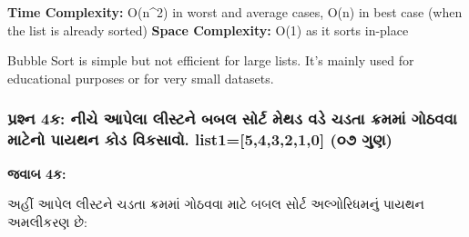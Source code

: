 \textbf{Time Complexity:} O(n\^{}2) in worst and average cases, O(n) in
best case (when the list is already sorted) \textbf{Space Complexity:}
O(1) as it sorts in-place

Bubble Sort is simple but not efficient for large lists. It's mainly
used for educational purposes or for very small datasets.

\hypertarget{uxaaauxab0uxab6uxaa8-4uxa95-uxaa8uxa9a-uxa86uxaaauxab2-uxab2uxab8uxa9fuxaa8-uxaacuxaacuxab2-uxab8uxab0uxa9f-uxaaeuxaa5uxaa1-uxab5uxaa1-uxa9auxaa1uxaa4-uxa95uxab0uxaaeuxaae-uxa97uxaa0uxab5uxab5-uxaaeuxa9fuxaa8-uxaaauxaafuxaa5uxaa8-uxa95uxaa1-uxab5uxa95uxab8uxab5.-list1543210-uxae6uxaed-uxa97uxaa3}{%
\subsubsection{પ્રશ્ન 4ક: નીચે આપેલા લીસ્ટને બબલ સોર્ટ મેથડ વડે ચડતા ક્રમમાં ગોઠવવા
માટેનો પાયથન કોડ વિકસાવો. list1={[}5,4,3,2,1,0{]} (૦૭
ગુણ)}\label{uxaaauxab0uxab6uxaa8-4uxa95-uxaa8uxa9a-uxa86uxaaauxab2-uxab2uxab8uxa9fuxaa8-uxaacuxaacuxab2-uxab8uxab0uxa9f-uxaaeuxaa5uxaa1-uxab5uxaa1-uxa9auxaa1uxaa4-uxa95uxab0uxaaeuxaae-uxa97uxaa0uxab5uxab5-uxaaeuxa9fuxaa8-uxaaauxaafuxaa5uxaa8-uxa95uxaa1-uxab5uxa95uxab8uxab5.-list1543210-uxae6uxaed-uxa97uxaa3}}

\textbf{જવાબ 4ક:}

અહીં આપેલ લીસ્ટને ચડતા ક્રમમાં ગોઠવવા માટે બબલ સોર્ટ અલ્ગોરિધમનું પાયથન અમલીકરણ છે:

